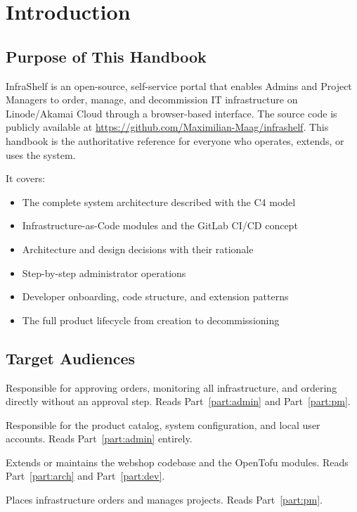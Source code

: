 \documentclass[12pt,a4paper,twoside]{report}
\newcommand{\role}[1]{\textsf{\textbf{#1}}}
\begin{document}
\chapter{Introduction}
\label{ch:intro}

\section{Purpose of This Handbook}

InfraShelf is an open-source, self-service portal that enables Admins and Project Managers to order, manage, and decommission IT infrastructure on Linode/Akamai Cloud through a browser-based interface. The source code is publicly available at \url{https://github.com/Maximilian-Maag/infrashelf}. This handbook is the authoritative reference for everyone who operates, extends, or uses the system.

It covers:
\begin{itemize}
  \item The complete system architecture described with the C4 model
  \item Infrastructure-as-Code modules and the GitLab CI/CD concept
  \item Architecture and design decisions with their rationale
  \item Step-by-step administrator operations
  \item Developer onboarding, code structure, and extension patterns
  \item The full product lifecycle from creation to decommissioning
\end{itemize}

\section{Target Audiences}

\begin{description}[leftmargin=3.5cm, style=nextline]
  \item[\role{Admin}]
    Responsible for approving orders, monitoring all infrastructure, and
    ordering directly without an approval step. Reads
    Part~\ref{part:admin} and Part~\ref{part:pm}.
  \item[\role{Root}]
    Responsible for the product catalog, system configuration, and local
    user accounts. Reads Part~\ref{part:admin} entirely.
  \item[\role{Developer}]
    Extends or maintains the webshop codebase and the OpenTofu modules.
    Reads Part~\ref{part:arch} and Part~\ref{part:dev}.
  \item[\role{Project Manager}]
    Places infrastructure orders and manages projects. Reads
    Part~\ref{part:pm}.
\end{description}
\end{document}
